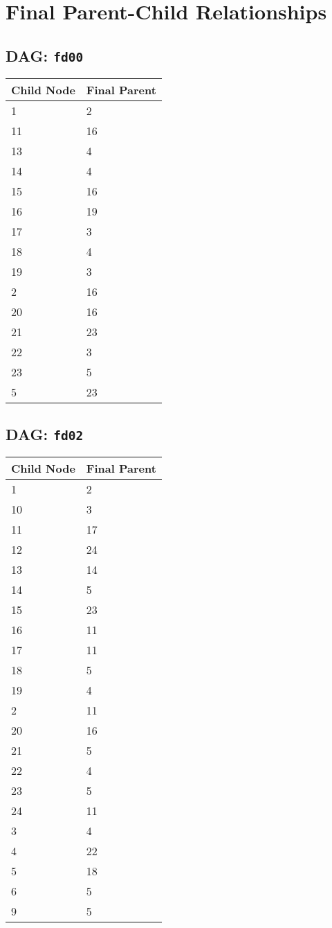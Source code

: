 \documentclass{article}
\begin{document}
\pagestyle{fancy}
\fancyhf{}
\section*{Final Parent-Child Relationships}
\subsection*{DAG: \texttt{fd00}}
\begin{tabular}{ll}
\toprule
\textbf{Child Node} & \textbf{Final Parent} \\
\midrule
1 & 2 \\
11 & 16 \\
13 & 4 \\
14 & 4 \\
15 & 16 \\
16 & 19 \\
17 & 3 \\
18 & 4 \\
19 & 3 \\
2 & 16 \\
20 & 16 \\
21 & 23 \\
22 & 3 \\
23 & 5 \\
5 & 23 \\
\bottomrule
\end{tabular}

\subsection*{DAG: \texttt{fd02}}
\begin{tabular}{ll}
\toprule
\textbf{Child Node} & \textbf{Final Parent} \\
\midrule
1 & 2 \\
10 & 3 \\
11 & 17 \\
12 & 24 \\
13 & 14 \\
14 & 5 \\
15 & 23 \\
16 & 11 \\
17 & 11 \\
18 & 5 \\
19 & 4 \\
2 & 11 \\
20 & 16 \\
21 & 5 \\
22 & 4 \\
23 & 5 \\
24 & 11 \\
3 & 4 \\
4 & 22 \\
5 & 18 \\
6 & 5 \\
9 & 5 \\
\bottomrule
\end{tabular}
\end{document}

